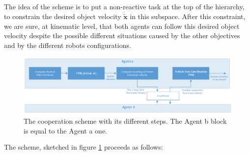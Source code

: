 The idea of the scheme is to put a non-reactive task at the top of the hierarchy, to constrain the desired object velocity $\boldsymbol{\dot{\tilde{x}}}$ in this subspace. After this constraint, we are sure, at kinematic level, that both agents can follow this desired object velocity despite the possible different situations caused by the other objectives and by the different robots configurations.\\
\begin{figure}[H]
	\centering
	\centerline{
		\includegraphics[width=1.22\columnwidth]{coopScheme2.png} }
	\caption[Cooperation Scheme in the TPIK]{The cooperation scheme with its different steps. The Agent b block is equal to the Agent a one.}
	\label{fig:coopScheme}
\end{figure}
\vspace{10px}
\noindent The scheme, sketched in figure \ref{fig:coopScheme} proceeds as follows:
